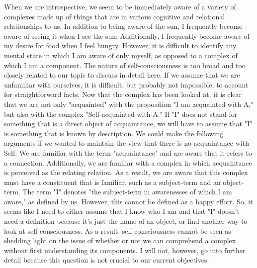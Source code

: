 \documentclass[a4paper,12pt]{book}[2004/02/16]
\theoremstyle{ilemma}
\theoremstyle{itheorem}
\theoremstyle{iother}
\theoremstyle{icorollary}
\theoremstyle{numcorollary}
\theoremstyle{idefinition}
\begin{document}
When we are introspective, we seem to be immediately aware of a variety of complexes made up of things that are in various cognitive and relational relationships to us. In addition to being aware of the sun, I frequently become aware of seeing it when I see the sun;
Additionally, I frequently become aware of my desire for food when I feel hungry. However, it is difficult to identify any mental state in which I am aware of only myself, as opposed to a complex of which I am a component. The nature of self-consciousness is too broad and too closely related to our topic to discuss in detail here. If we assume that we are unfamiliar with ourselves, it is difficult, but probably not impossible, to account for straightforward facts. Now that the complex has been looked at, it is clear that we are not only "acquainted" with the proposition "I am acquainted with A," but also with the complex "Self-acquainted-with-A." If "I" does not stand for something that is a direct object of acquaintance, we will have to assume that "I" is something that is known by description. We could make the following arguments if we wanted to maintain the view that there is no acquaintance with Self: We are familiar with the term "acquaintance" and are aware that it refers to a connection. Additionally, we are familiar with a complex in which acquaintance is perceived as the relating relation. As a result, we are aware that this complex must have a constituent that is familiar, such as a subject-term and an object-term. The term "I" denotes "the subject-term in awarenesses of which I am aware," as defined by us. However, this cannot be defined as a happy effort. So, it seems like I need to either assume that I know who I am and that "I" doesn't need a definition because it's just the name of an object, or find another way to look at self-consciousness. As a result, self-consciousness cannot be seen as shedding light on the issue of whether or not we can comprehend a complex without first understanding its components. I will not, however, go into further detail because this question is not crucial to our current objectives.
\end{document}
